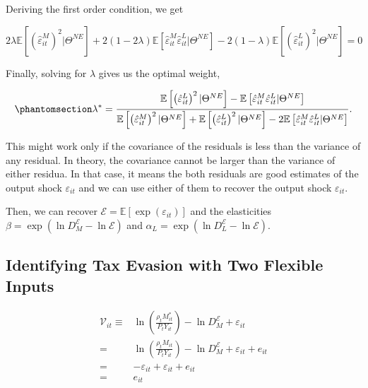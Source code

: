 \documentclass[
  12pt]{article}
\theoremstyle{definition}
\theoremstyle{remark}
\begin{document}
Deriving the first order condition, we get

\[
2\lambda \mathbb{E}\left[\left(\hat \varepsilon^M_{it}\right)^2|\Theta^{NE}\right] + 2(1-2\lambda) \mathbb{E}\left[\hat \varepsilon^M_{it}\hat \varepsilon^L_{it}|\Theta^{NE}\right] - 2(1-\lambda)\mathbb{E}\left[\left(\hat \varepsilon^L_{it}\right)^2|\Theta^{NE}\right] = 0
\]

Finally, solving for \(\lambda\) gives us the optimal weight,

\begin{equation}\phantomsection\label{eq-opt-lambda}{
\lambda^* = \frac{\mathbb{E}\left[\left(\hat \varepsilon^L_{it}\right)^2|\Theta^{NE}\right]-\mathbb{E}\left[\hat \varepsilon^M_{it}\hat \varepsilon^L_{it}|\Theta^{NE}\right]}{\mathbb{E}\left[\left(\hat \varepsilon^M_{it}\right)^2|\Theta^{NE}\right] + \mathbb{E}\left[\left(\hat \varepsilon^L_{it}\right)^2|\Theta^{NE}\right]-2\mathbb{E}\left[\hat \varepsilon^M_{it}\hat \varepsilon^L_{it}|\Theta^{NE}\right]}.
}\end{equation}

This might work only if the covariance of the residuals is less than the
variance of any residual. In theory, the covariance cannot be larger
than the variance of either residua. In that case, it means the both
residuals are good estimates of the output shock \(\varepsilon_{it}\)
and we can use either of them to recover the output shock
\(\varepsilon_{it}\).

Then, we can recover \(\mathcal{E}=\mathbb{E}[\exp(\varepsilon_{it})]\)
and the elasticities
\(\beta=\exp(\ln D^{\mathcal{E}}_M-\ln \mathcal{E})\) and
\(\alpha_L=\exp(\ln D^{\mathcal{E}}_L-\ln \mathcal{E})\).

\subsection{Identifying Tax Evasion with Two Flexible
Inputs}\label{identifying-tax-evasion-with-two-flexible-inputs}

\[
\begin{aligned}    
 \mathcal{V}_{it} \equiv&\ln \left(\frac{\rho_t M^*_{it}}{P_t Y_{it}}\right)-\ln D^{\mathcal{E}}_M +\varepsilon_{it}\\
 =& \ln \left(\frac{\rho_t M_{it}}{P_t Y_{it}}\right)-\ln D^{\mathcal{E}}_M +\varepsilon_{it}+e_{it}\\
 =& -\varepsilon_{it}+\varepsilon_{it}+e_{it}\\
 =& e_{it}
\end{aligned}
\]
\end{document}
